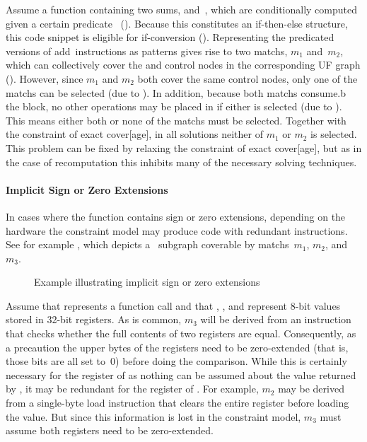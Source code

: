 %
Assume a \gls{function} containing two sums,  and~, which
are conditionally computed given a certain predicate~
().
%
Because this constitutes an if-then-else structure, this code snippet is
eligible for \gls{if-conversion} ().
%
Representing the predicated versions of add~\glspl{instruction} as
\glspl{pattern} gives rise to two \glspl{match}, $m_1$ and~$m_2$, which can
collectively cover the  and \glspl{control node} in
the corresponding \gls{UF graph} ().
%
However, since $m_1$ and $m_2$ both cover the same \glspl{control node}, only
one of the \glspl{match} can be selected (due to
).
%
In addition, because both \glspl{match} \gls{consume.b} the 
\gls{block}, no other \glspl{operation} may be placed in  if
either is selected (due to ).
%
This means either both or none of the \glspl{match} must be selected.
%
Together with the \gls{constraint} of exact \gls{cover}[age], in all
\glspl{solution} neither of $m_1$ or $m_2$ is selected.
%
This problem can be fixed by relaxing the \gls{constraint} of exact
\gls{cover}[age], but as in the case of \gls{recomputation} this inhibits many
of the necessary solving techniques.


\paragraph{Implicit Sign or Zero Extensions}

In cases where the \gls{function} contains sign or zero extensions, depending on
the hardware the \gls{constraint model} may produce code with redundant
\glspl{instruction}.
%
See for example , which depicts a
~\gls{subgraph} coverable by \glspl{match}~$m_1$, $m_2$,
and~$m_3$.
%
\begin{figure}
  \centering%
  

  \caption{Example illustrating implicit sign or zero extensions}%
\end{figure}
%
Assume that  represents a \gls{function} call and that ,
, and  represent \num{8}-bit values stored in \num{32}-bit
\glspl{register}.
%
As is common, $m_3$ will be derived from an \gls{instruction} that checks
whether the full contents of two \glspl{register} are equal.
%
Consequently, as a precaution the upper bytes of the \glspl{register} need to be
zero-extended (that is, those bits are all set to~\num{0}) before doing the
comparison.
%
While this is certainly necessary for the \gls{register} of  as
nothing can be assumed about the value returned by , it may be
redundant for the register of .
%
For example, $m_2$ may be derived from a single-byte load \gls{instruction} that
clears the entire \gls{register} before loading the value.
%
But since this information is lost in the \gls{constraint model}, $m_3$ must
assume both \glspl{register} need to be zero-extended.

